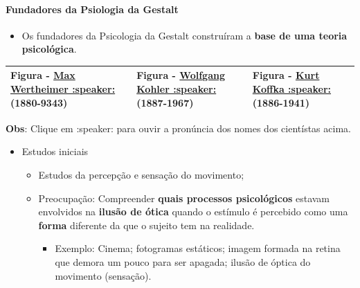 \documentclass[
]{book}
\providecommand{\tightlist}{%
  \setlength{\itemsep}{0pt}\setlength{\parskip}{0pt}}
\begin{document}
\hypertarget{fundadores-da-psiologia-da-gestalt}{%
\paragraph{Fundadores da Psiologia da Gestalt}\label{fundadores-da-psiologia-da-gestalt}}

\begin{itemize}
\tightlist
\item
  Os fundadores da Psicologia da Gestalt construíram a \textbf{base de uma teoria psicológica}.
\end{itemize}

\begin{longtable}[]{@{}
  >{\centering\arraybackslash}p{}
  >{\centering\arraybackslash}p{}
  >{\centering\arraybackslash}p{}@{}}
\toprule()
\endhead
Figura - \href{https://translate.google.com/?sl=hu\&tl=pt\&text=Max\%20Wertheimer\&op=translate}{Max Wertheimer :speaker:} (1880-9343) & Figura - \href{https://translate.google.com/?sl=de\&tl=pt\&text=Wolfgang\%20Kohler\&op=translate}{Wolfgang Kohler :speaker:}(1887-1967) & Figura - \href{https://translate.google.com/?sl=de\&tl=pt\&text=Kurt\%20Koffka\&op=translate}{Kurt Koffka :speaker:}(1886-1941) \\
\bottomrule()
\end{longtable}

\textbf{Obs}: Clique em :speaker: para ouvir a pronúncia dos nomes dos cientístas acima.

\begin{itemize}
\tightlist
\item
  Estudos iniciais

  \begin{itemize}
  \tightlist
  \item
    Estudos da percepção e sensação do movimento;
  \item
    Preocupação: Compreender \textbf{quais processos psicológicos} estavam envolvidos na \textbf{ilusão de ótica} quando o estímulo é percebido como uma \textbf{forma} diferente da que o sujeito tem na realidade.

    \begin{itemize}
    \tightlist
    \item
      Exemplo: Cinema; fotogramas estáticos; imagem formada na retina que demora um pouco para ser apagada; ilusão de óptica do movimento (sensação).
    \end{itemize}
  \end{itemize}
\end{itemize}
\end{document}
